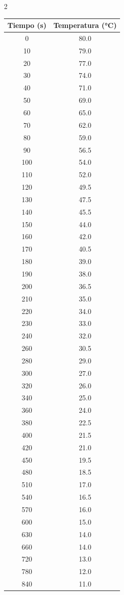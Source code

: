 \documentclass[11pt,letterpaper]{article}
\begin{document}
\begin{multicols}{2}
	\begin{tabular}{|c|c|}
		\hline
		\textbf{Tiempo (s)} & \textbf{Temperatura (°C)} \\ \hline
		0    & 80.0  \\ \hline
		10   & 79.0  \\ \hline
		20   & 77.0  \\ \hline
		30   & 74.0  \\ \hline
		40   & 71.0  \\ \hline
		50   & 69.0  \\ \hline
		60   & 65.0  \\ \hline
		70   & 62.0  \\ \hline
		80   & 59.0  \\ \hline
		90   & 56.5  \\ \hline
		100  & 54.0  \\ \hline
		110  & 52.0  \\ \hline
		120  & 49.5  \\ \hline
		130  & 47.5  \\ \hline
		140  & 45.5  \\ \hline
		150  & 44.0  \\ \hline
		160  & 42.0  \\ \hline
		170  & 40.5  \\ \hline
		180  & 39.0  \\ \hline
		190  & 38.0  \\ \hline
		200  & 36.5  \\ \hline
		210  & 35.0  \\ \hline
		220  & 34.0  \\ \hline
		230  & 33.0  \\ \hline
		240  & 32.0  \\ \hline
		260  & 30.5  \\ \hline
		280  & 29.0  \\ \hline
		300  & 27.0  \\ \hline
		320  & 26.0  \\ \hline
		340  & 25.0  \\ \hline
		360  & 24.0  \\ \hline
		380  & 22.5  \\ \hline
		400  & 21.5  \\ \hline
		420  & 21.0  \\ \hline
		450  & 19.5  \\ \hline
		480  & 18.5  \\ \hline
		510  & 17.0  \\ \hline
		540  & 16.5  \\ \hline
		570  & 16.0  \\ \hline
		600  & 15.0  \\ \hline
		630  & 14.0  \\ \hline
		660  & 14.0  \\ \hline
		720  & 13.0  \\ \hline
		780  & 12.0  \\ \hline
		840  & 11.0  \\ \hline
  \end{tabular}


\end{multicols}
\end{document}
